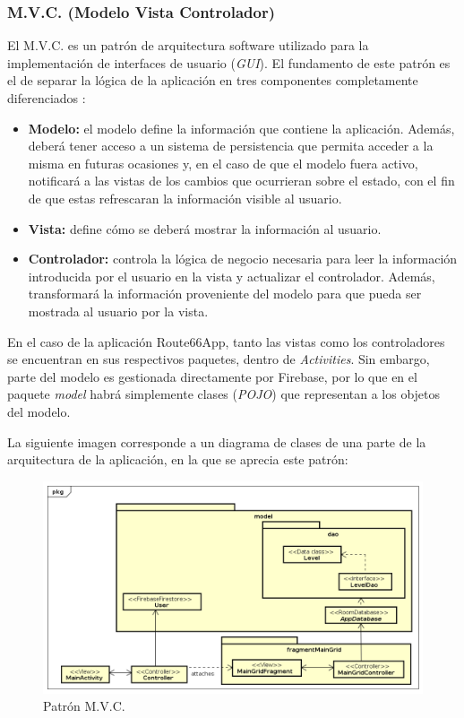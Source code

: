 \documentclass[twoside]{report}
\begin{document}
\subsubsection{M.V.C. (Modelo Vista Controlador)}
El M.V.C. es un patrón de arquitectura software utilizado para la implementación de interfaces de usuario (\textit{GUI}). El fundamento de este patrón es el de separar la lógica de la aplicación en tres componentes completamente diferenciados \cite{mvcua}:
\begin{itemize}
\item \textbf{Modelo:} el modelo define la información que contiene la aplicación. Además, deberá tener acceso a un sistema de persistencia que permita acceder a la misma en futuras ocasiones y, en el caso de que el modelo fuera activo, notificará a las vistas de los cambios que ocurrieran sobre el estado, con el fin de que estas refrescaran la información visible al usuario.
\item \textbf{Vista:} define cómo se deberá mostrar la información al usuario.

\item \textbf{Controlador:} controla la lógica de negocio necesaria para leer la información introducida por el usuario en la vista y actualizar el controlador. Además, transformará la información proveniente del modelo para que pueda ser mostrada al usuario por la vista.
\end{itemize}
En el caso de la aplicación Route66App, tanto las vistas como los controladores se encuentran en sus respectivos paquetes, dentro de \textit{Activities}. Sin embargo, parte del modelo es gestionada directamente por Firebase, por lo que en el paquete \textit{model} habrá simplemente clases (\textit{POJO}) que representan a los objetos del modelo.

La siguiente imagen corresponde a un diagrama de clases de una parte de la arquitectura de la aplicación, en la que se aprecia este patrón:

\begin{figure}[H]
\centering
\includegraphics[scale=0.5]{images/mvcPattern}
\caption{Patrón M.V.C.}
\end{figure}
\end{document}
